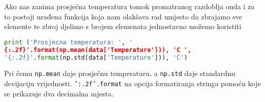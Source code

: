 Ako nas zanima prosječna temperatura tomok promatranog razdoblja onda i za to postoji urađena funkcija koja nam olakšava rad umjesto da zbrajamo sve elemente te zbroj djelimo s brojem elemenata jednostavno možemo koristiti
\begin{lstlisting}[language=Python]
print ('Prosjecna temperatura: ', '
{:.2f}'.format(np.mean(data['Temperature'])), 'C ',
'{:.2f}'.format(np.std(data['Temperature'])), 'C')
\end{lstlisting}
Pri čemu \texttt{np.mean} daje prosječnu temperaturu, a \texttt{np.std} daje standardnu devijaciju vrijednosti.
\texttt{'{:.2f}'.format} na opcija formatiranja stringa pomoću koje se prikazuje dva decimalna mjesta.
